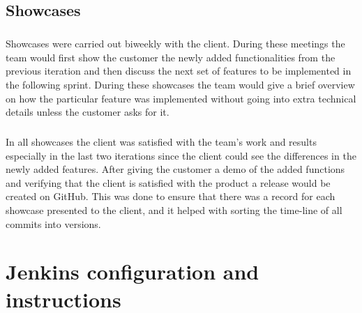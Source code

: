 \documentclass[12pt, a4paper]{report}
\begin{document}
\section{Showcases}
\paragraph{\;\;\:}
\noindent
Showcases were carried out biweekly with the client. During these meetings the team would first show the customer the newly added functionalities from the previous iteration and then discuss the next set of features to be implemented in the following sprint. During these showcases the team would give a brief overview on how the particular feature was implemented without going into extra technical details unless the customer asks for it. 
\paragraph{\;\:\:}
\noindent
In all showcases the client was satisfied with the team's work and results especially in the last two iterations since the client could see the differences in the newly added features. After giving the customer a demo of the added functions and verifying that the client is satisfied with the product a release would be created on GitHub. This was done to ensure that there was a record for each showcase presented to the client, and it helped with sorting the time-line of all commits into versions. 

\newpage
\chapter{Jenkins configuration and instructions}
\end{document}

